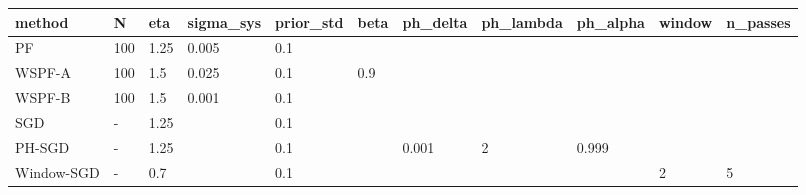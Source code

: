 \begin{tabular}{lllllllllll}
\hline
method & N & eta & sigma\_sys & prior\_std & beta & ph\_delta & ph\_lambda & ph\_alpha & window & n\_passes \\
\hline
PF & 100 & 1.25 & 0.005 & 0.1 &  &  &  &  &  &  \\
WSPF-A & 100 & 1.5 & 0.025 & 0.1 & 0.9 &  &  &  &  &  \\
WSPF-B & 100 & 1.5 & 0.001 & 0.1 &  &  &  &  &  &  \\
SGD & - & 1.25 &  & 0.1 &  &  &  &  &  &  \\
PH-SGD & - & 1.25 &  & 0.1 &  & 0.001 & 2 & 0.999 &  &  \\
Window-SGD & - & 0.7 &  & 0.1 &  &  &  &  & 2 & 5 \\
\hline
\end{tabular}
